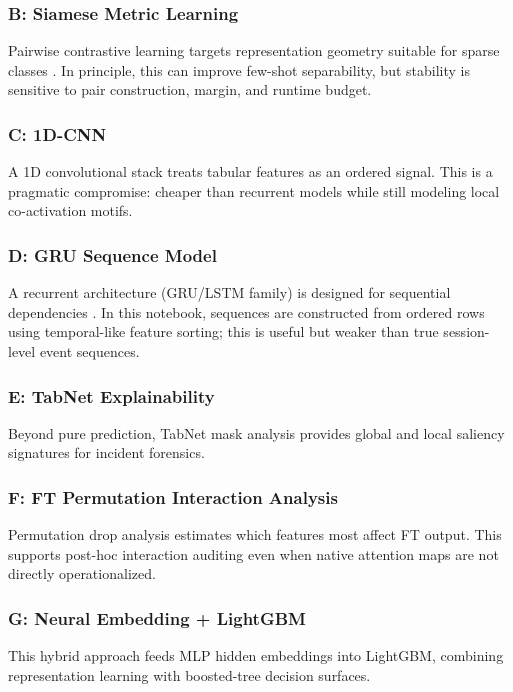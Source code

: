 \documentclass[10pt,journal]{IEEEtran}
\begin{document}
\subsubsection{B: Siamese Metric Learning}
Pairwise contrastive learning targets representation geometry suitable for sparse classes \cite{koch2015siamese}. In principle, this can improve few-shot separability, but stability is sensitive to pair construction, margin, and runtime budget.

\subsubsection{C: 1D-CNN}
A 1D convolutional stack treats tabular features as an ordered signal. This is a pragmatic compromise: cheaper than recurrent models while still modeling local co-activation motifs.

\subsubsection{D: GRU Sequence Model}
A recurrent architecture (GRU/LSTM family) is designed for sequential dependencies \cite{cho2014gru,hochreiter1997lstm}. In this notebook, sequences are constructed from ordered rows using temporal-like feature sorting; this is useful but weaker than true session-level event sequences.

\subsubsection{E: TabNet Explainability}
Beyond pure prediction, TabNet mask analysis provides global and local saliency signatures for incident forensics.

\subsubsection{F: FT Permutation Interaction Analysis}
Permutation drop analysis estimates which features most affect FT output. This supports post-hoc interaction auditing even when native attention maps are not directly operationalized.

\subsubsection{G: Neural Embedding + LightGBM}
This hybrid approach feeds MLP hidden embeddings into LightGBM, combining representation learning with boosted-tree decision surfaces.
\end{document}
